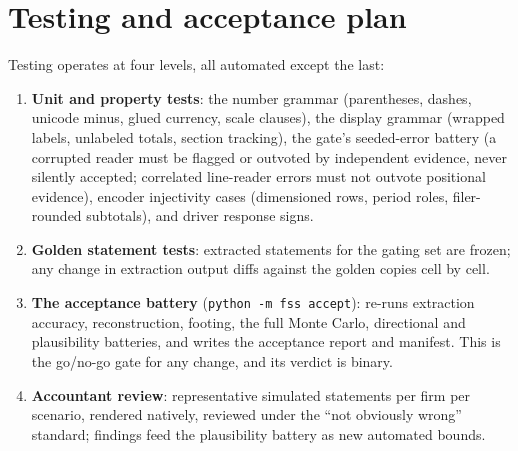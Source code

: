 \documentclass[11pt]{article}
\begin{document}
\section{Testing and acceptance plan}
\label{sec:testing}
Testing operates at four levels, all automated except the last:
\begin{enumerate}
  \item \textbf{Unit and property tests}: the number grammar (parentheses, dashes, unicode minus, glued currency, scale clauses), the display grammar (wrapped labels, unlabeled totals, section tracking), the gate's seeded-error battery (a corrupted reader must be flagged or outvoted by independent evidence, never silently accepted; correlated line-reader errors must not outvote positional evidence), encoder injectivity cases (dimensioned rows, period roles, filer-rounded subtotals), and driver response signs.
  \item \textbf{Golden statement tests}: extracted statements for the gating set are frozen; any change in extraction output diffs against the golden copies cell by cell.
  \item \textbf{The acceptance battery} (\texttt{python -m fss accept}): re-runs extraction accuracy, reconstruction, footing, the full Monte Carlo, directional and plausibility batteries, and writes the acceptance report and manifest. This is the go/no-go gate for any change, and its verdict is binary.
  \item \textbf{Accountant review}: representative simulated statements per firm per scenario, rendered natively, reviewed under the ``not obviously wrong'' standard; findings feed the plausibility battery as new automated bounds.
\end{enumerate}
\end{document}
